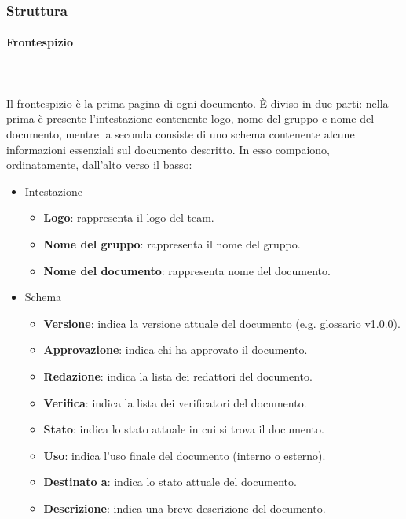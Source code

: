 \documentclass[../norme-di-progetto.tex]{subfiles}
\begin{document}
\subsubsection{Struttura}
\label{subs:struttura}

\paragraph{Frontespizio}\mbox{}\\
\label{par:frontespizio}
\\Il frontespizio è la prima pagina di ogni documento. È diviso in due parti: nella prima è presente l'intestazione contenente logo, nome del gruppo e nome del documento, mentre la seconda consiste di uno schema contenente alcune informazioni essenziali sul documento descritto. In esso compaiono, ordinatamente, dall'alto verso il basso:

\begin{itemize}
  \item Intestazione
  \begin{itemize}
    \item \textbf{Logo}: rappresenta il logo del team.
    \item \textbf{Nome del gruppo}: rappresenta il nome del gruppo.
    \item \textbf{Nome del documento}: rappresenta nome del documento.
  \end{itemize}
  \item Schema
  \begin{itemize}
    \item \textbf{Versione}: indica la versione attuale del documento (e.g. glossario v1.0.0).
    \item \textbf{Approvazione}: indica chi ha approvato il documento.
    \item \textbf{Redazione}: indica la lista dei redattori del documento.
    \item \textbf{Verifica}: indica la lista dei verificatori del documento.
    \item \textbf{Stato}: indica lo stato attuale in cui si trova il documento.
    \item \textbf{Uso}: indica l'uso finale del documento (interno o esterno).
    \item \textbf{Destinato a}: indica lo stato attuale del documento.
    \item \textbf{Descrizione}: indica una breve descrizione del documento.
  \end{itemize}
\end{itemize}
\end{document}

